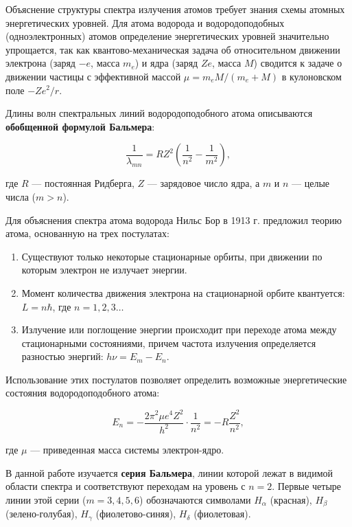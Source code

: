 \documentclass[a4paper,12pt]{article}
\begin{document}
Объяснение структуры спектра излучения атомов требует знания схемы атомных энергетических уровней. Для атома водорода и водородоподобных (одноэлектронных) атомов определение энергетических уровней значительно упрощается, так как квантово-механическая задача об относительном движении электрона (заряд \(-e\), масса \(m_e\)) и ядра (заряд \(Ze\), масса \(M\)) сводится к задаче о движении частицы с эффективной массой \(\mu = m_e M / (m_e + M)\) в кулоновском поле \(-Ze^2 / r\).

Длины волн спектральных линий водородоподобного атома описываются \textbf{обобщенной формулой Бальмера}:

\begin{equation}\label{eq:balmer}
    \frac{1}{\lambda_{mn}} = R Z^2 \left( \frac{1}{n^2} - \frac{1}{m^2} \right),
\end{equation}

где \(R\) — постоянная Ридберга, \(Z\) — зарядовое число ядра, а \(m\) и \(n\) — целые числа (\(m > n\)).

Для объяснения спектра атома водорода Нильс Бор в 1913 г. предложил теорию атома, основанную на трех постулатах:
\begin{enumerate}
    \item Существуют только некоторые стационарные орбиты, при движении по которым электрон не излучает энергии.
    \item Момент количества движения электрона на стационарной орбите квантуется: \(L = n\hbar\), где \(n=1,2,3\ldots\)
    \item Излучение или поглощение энергии происходит при переходе атома между стационарными состояниями, причем частота излучения определяется разностью энергий: \(h\nu = E_m - E_n\).
\end{enumerate}

Использование этих постулатов позволяет определить возможные энергетические состояния водородоподобного атома:

\begin{equation}\label{eq:energy_levels}
    E_n = -\frac{2\pi^2 \mu e^4 Z^2}{h^2} \cdot \frac{1}{n^2} = -R \frac{Z^2}{n^2},
\end{equation}

где \(\mu\) — приведенная масса системы электрон-ядро.

В данной работе изучается \textbf{серия Бальмера}, линии которой лежат в видимой области спектра и соответствуют переходам на уровень с \(n=2\). Первые четыре линии этой серии (\(m = 3, 4, 5, 6\)) обозначаются символами \(H_\alpha\) (красная), \(H_\beta\) (зелено-голубая), \(H_\gamma\) (фиолетово-синяя), \(H_\delta\) (фиолетовая).
\end{document}
